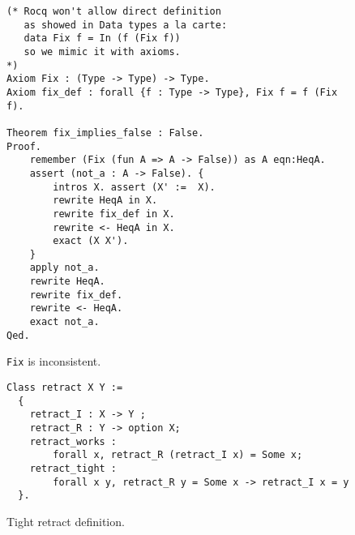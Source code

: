 \documentclass[sigplan,nonacm,review]{acmart}
\begin{document}
\begin{figure}[H]
\begin{lstlisting}[language=Coq]
(* Rocq won't allow direct definition
   as showed in Data types a la carte:
   data Fix f = In (f (Fix f))
   so we mimic it with axioms.
*)
Axiom Fix : (Type -> Type) -> Type.
Axiom fix_def : forall {f : Type -> Type}, Fix f = f (Fix f).

Theorem fix_implies_false : False. 
Proof.
    remember (Fix (fun A => A -> False)) as A eqn:HeqA.
    assert (not_a : A -> False). { 
        intros X. assert (X' :=  X).
        rewrite HeqA in X.
        rewrite fix_def in X.
        rewrite <- HeqA in X.
        exact (X X').
    }
    apply not_a.
    rewrite HeqA.
    rewrite fix_def.
    rewrite <- HeqA.
    exact not_a.
Qed.
\end{lstlisting}
\caption{\texttt{Fix} is inconsistent.}
  \label{appendix:false_proof}
\end{figure}

\begin{figure}[H]
\begin{lstlisting}[language=Coq]
Class retract X Y :=
  {
    retract_I : X -> Y ;
    retract_R : Y -> option X;
    retract_works : 
        forall x, retract_R (retract_I x) = Some x;
    retract_tight : 
        forall x y, retract_R y = Some x -> retract_I x = y
  }.
\end{lstlisting}
\caption{Tight retract definition.}
  \label{appendix:tight_retract}
\end{figure}
\end{document}

